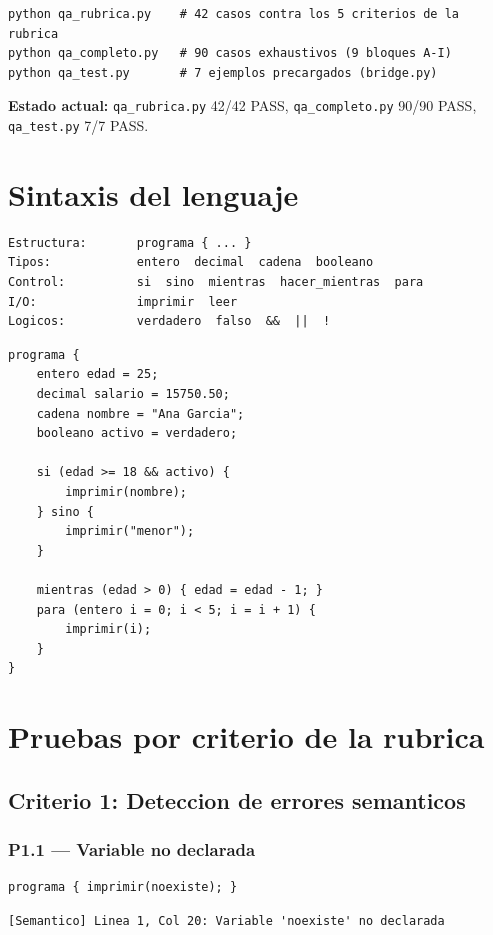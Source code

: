 \documentclass[11pt,a4paper]{article}
\begin{document}
\begin{lstlisting}[style=tac]
python qa_rubrica.py    # 42 casos contra los 5 criterios de la rubrica
python qa_completo.py   # 90 casos exhaustivos (9 bloques A-I)
python qa_test.py       # 7 ejemplos precargados (bridge.py)
\end{lstlisting}

\textbf{Estado actual:} \texttt{qa\_rubrica.py} 42/42 PASS,
\texttt{qa\_completo.py} 90/90 PASS, \texttt{qa\_test.py} 7/7 PASS.

\section{Sintaxis del lenguaje}

\begin{lstlisting}[style=tac]
Estructura:       programa { ... }
Tipos:            entero  decimal  cadena  booleano
Control:          si  sino  mientras  hacer_mientras  para
I/O:              imprimir  leer
Logicos:          verdadero  falso  &&  ||  !
\end{lstlisting}

\begin{lstlisting}[style=ml]
programa {
    entero edad = 25;
    decimal salario = 15750.50;
    cadena nombre = "Ana Garcia";
    booleano activo = verdadero;

    si (edad >= 18 && activo) {
        imprimir(nombre);
    } sino {
        imprimir("menor");
    }

    mientras (edad > 0) { edad = edad - 1; }
    para (entero i = 0; i < 5; i = i + 1) {
        imprimir(i);
    }
}
\end{lstlisting}

\section{Pruebas por criterio de la rubrica}

\subsection{Criterio 1: Deteccion de errores semanticos}

\subsubsection{P1.1 --- Variable no declarada}
\begin{lstlisting}[style=ml]
programa { imprimir(noexiste); }
\end{lstlisting}
\begin{lstlisting}[style=err]
[Semantico] Linea 1, Col 20: Variable 'noexiste' no declarada
\end{lstlisting}
\end{document}
